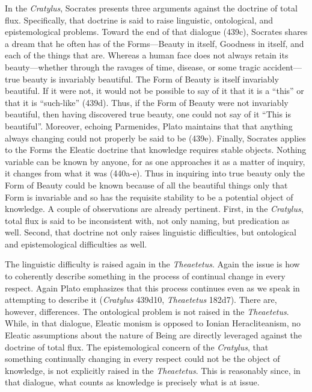 In the \emph{Cratylus}, Socrates presents three arguments against the doctrine of total flux. Specifically, that doctrine is said to raise linguistic, ontological, and epistemological problems. Toward the end of that dialogue (439c), Socrates shares a dream that he often has of the Forms---Beauty in itself, Goodness in itself, and each of the things that are. Whereas a human face does not always retain its beauty---whether through the ravages of time, disease, or some tragic accident---true beauty is invariably beautiful. The Form of Beauty is itself invariably beautiful. If it were not, it would not be possible to say of it that it is a ``this'' or that it is ``such-like'' (439d). Thus, if the Form of Beauty were not invariably beautiful, then having discovered true beauty, one could not say of it ``This is beautiful''.  Moreover, echoing Parmenides, Plato maintains that that anything always changing could not properly be said to be (439e). Finally, Socrates applies to the Forms the Eleatic doctrine that knowledge requires stable objects. Nothing variable can be known by anyone, for as one approaches it as a matter of inquiry, it changes from what it was (440a-e). Thus in inquiring into true beauty only the Form of Beauty could be known because of all the beautiful things only that Form is invariable and so has the requisite stability to be a potential object of knowledge. A couple of observations are already pertinent. First, in the \emph{Cratylus}, total flux is said to be inconsistent with, not only naming, but predication as well. Second, that doctrine not only raises linguistic difficulties, but ontological and epistemological difficulties as well.

The linguistic difficulty is raised again in the \emph{Theaetetus}. Again the issue is how to coherently describe something in the process of continual change in every respect. Again Plato emphasizes that this process continues even as we speak in attempting to describe it (\emph{Cratylus} 439d10, \emph{Theaetetus} 182d7). There are, however, differences. The ontological problem is not raised in the \emph{Theaetetus}. While, in that dialogue, Eleatic monism is opposed to Ionian Heracliteanism, no Eleatic assumptions about the nature of Being are directly leveraged against the doctrine of total flux. The epistemological concern of the \emph{Cratylus}, that something continually changing in every respect could not be the object of knowledge, is not explicitly raised in the \emph{Theaetetus}. This is reasonably since, in that dialogue, what counts as knowledge is precisely what is at issue. 

